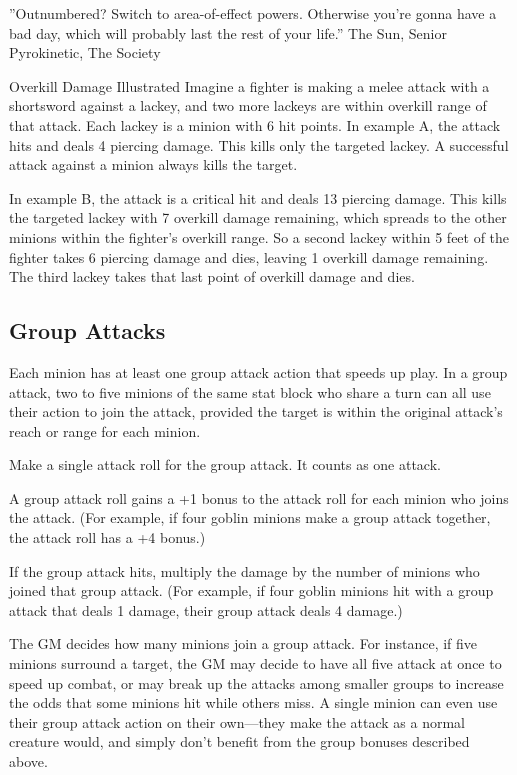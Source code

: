 \documentclass[10pt,a4paper,twoside,bg=print,twocolumn,openany,nodeprecatedcode]{dndbook}
\begin{document}
\DndQuote%
{}
{''Outnumbered? Switch to area-of-effect powers. Otherwise you're gonna have a bad day, which will probably last the rest of your life.''}
{The Sun, Senior Pyrokinetic, The Society}
\begin{DndSidebar}[float=!b]{Overkill Damage Illustrated}
Imagine a fighter is making a melee attack with a shortsword against a lackey, and two more lackeys are within overkill range of that attack. Each lackey is a minion with 6 hit points. In example A, the attack hits and deals 4 piercing damage. This kills only the targeted lackey. A successful attack against a minion always kills the target.



In example B, the attack is a critical hit and deals 13 piercing damage. This kills the targeted lackey with 7 overkill damage remaining, which spreads to the other minions within the fighter's overkill range. So a second lackey within 5 feet of the fighter takes 6 piercing damage and dies, leaving 1 overkill damage remaining. The third lackey takes that last point of overkill damage and dies.



\end{DndSidebar}

\subsection{Group Attacks}
Each minion has at least one group attack action that speeds up play. In a group attack, two to five minions of the same stat block who share a turn can all use their action to join the attack, provided the target is within the original attack's reach or range for each minion.


\begin{description}
\item Make a single attack roll for the group attack. It counts as one attack.
\item A group attack roll gains a +1 bonus to the attack roll for each minion who joins the attack. (For example, if four goblin minions make a group attack together, the attack roll has a +4 bonus.)
\item If the group attack hits, multiply the damage by the number of minions who joined that group attack. (For example, if four goblin minions hit with a group attack that deals 1 damage, their group attack deals 4 damage.)
\end{description}

The GM decides how many minions join a group attack. For instance, if five minions surround a target, the GM may decide to have all five attack at once to speed up combat, or may break up the attacks among smaller groups to increase the odds that some minions hit while others miss. A single minion can even use their group attack action on their own—they make the attack as a normal creature would, and simply don't benefit from the group bonuses described above.
\end{document}
